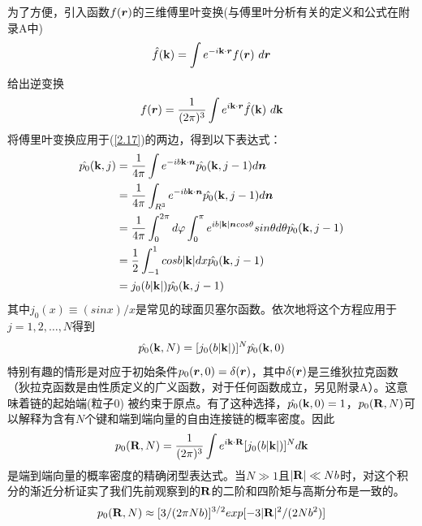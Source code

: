 为了方便，引入函数$f(\bm{r})$的三维傅里叶变换(与傅里叶分析有关的定义和公式在附录A中)\\
\begin{equation}
\hat{f}(\mathbf{k})=\int e^{-i\mathbf{k} \cdot \bm{r}}f(\bm{r})~d\bm{r}
\label{2.18}
\end{equation}
给出逆变换\\
\begin{equation}
 f(\bm{r})=\frac{1}{(2 \pi)^3} \int e^{i\mathbf{k} \cdot \bm{r}} \hat{f}(\mathbf{k})~d\mathbf{k}
\label{2.19}
\end{equation}
将傅里叶变换应用于(\ref{2.17})的两边，得到以下表达式：\\
\begin{equation}
\begin{aligned}
\hat{p_0}(\mathbf{k},j)&=\frac{1}{4 \pi} \int e^{-ib\mathbf{k} \cdot \bm{n}} \hat{p_0}(\mathbf{k},j-1)d\bm{n} \\&=\frac{1}{4 \pi} \int _{R^3}e^{-ib\mathbf{k} \cdot \bm{n}} \hat{p_0}(\mathbf{k},j-1)d\bm{n} \\&=
\frac{1}{4 \pi} \int _{0}^{2 \pi}d \varphi \int _{0}^{\pi} e^{ib|\mathbf{k}|\bm{n} cos \theta}sin \theta d \theta \hat{p_0}(\mathbf{k},j-1) \\&=\frac{1}{2} \int _{-1}^{1}cos b|\mathbf{k}|dx \hat{p_0}(\mathbf{k},j-1) \\&=j_0(b|\mathbf{k}|)\hat{p_0}(\mathbf{k},j-1)
\label{2.20}
\end{aligned}
\end{equation}
其中$j_0(x) \equiv (sinx)/x$是常见的球面贝塞尔函数。依次地将这个方程应用于$j=1,2,\ldots,N$得到\\
\begin{equation}
\hat{p_0}(\mathbf{k},N)=[j_0(b|\mathbf{k}|)]^{N}\hat{p_0}(\mathbf{k},0)
\label{2.21}
\end{equation}
特别有趣的情形是对应于初始条件$p_0(\bm{r},0)=\delta(\bm{r})$，其中$\delta(\bm{r})$是三维狄拉克函数（狄拉克函数是由性质定义的广义函数，对于任何函数成立，另见附录A）。这意味着链的起始端(粒子$0$) 被约束于原点。有了这种选择，$\hat{p_0}(\mathbf{k},0)=1$，$p_0(\mathbf{R},N)$可以解释为含有$N$个键和端到端向量的自由连接链的概率密度。因此\\
\begin{equation}
p_0(\mathbf{R},N)=\frac{1}{(2 \pi)^3 }\int e^{i\mathbf{k} \cdot \mathbf{R}}[j_0(b|\mathbf{k}|)]^{N}d\mathbf{k}
\label{2.22}
\end{equation}
是端到端向量的概率密度的精确闭型表达式。当$N\gg1$且$|\mathbf{R}| \ll Nb $时，对这个积分的渐近分析证实了我们先前观察到的$\mathbf{R}$的二阶和四阶矩与高斯分布是一致的。\\
\begin{equation}
p_0(\mathbf{R},N) \approx [3/(2 \pi Nb)]^{3/2}exp[-3|\mathbf{R}|^2/(2Nb^2)]
\label{2.23}
\end{equation}
